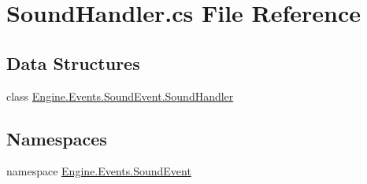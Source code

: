 \hypertarget{a00077}{}\section{Sound\+Handler.\+cs File Reference}
\label{a00077}
\subsection*{Data Structures}
\begin{DoxyCompactItemize}
\item 
class \hyperlink{a00394}{Engine.\+Events.\+Sound\+Event.\+Sound\+Handler}
\end{DoxyCompactItemize}
\subsection*{Namespaces}
\begin{DoxyCompactItemize}
\item 
namespace \hyperlink{a00250}{Engine.\+Events.\+Sound\+Event}
\end{DoxyCompactItemize}
